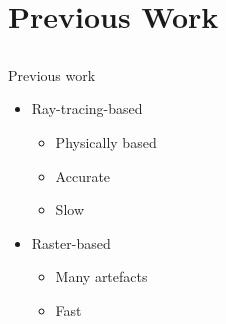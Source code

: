 \documentclass{beamer}
\begin{document}
\section{Previous Work}
\subsection{}

\begin{frame}{Previous work}

\begin{multicols}{2}

\begin{itemize}
\setlength\itemsep{0.5em}
\item Ray-tracing-based
		\begin{itemize}
		\setlength\itemsep{0.5em}
		\item Physically based 
		\item Accurate
		\item Slow
		\end{itemize}
\end{itemize}
	
\begin{itemize}
\setlength\itemsep{0.5em}	
\item Raster-based
		\begin{itemize}
		\setlength\itemsep{0.5em}
		\item Many artefacts
		\item Fast
		\end{itemize}
\end{itemize}


\end{multicols}


\end{frame}
\end{document}

